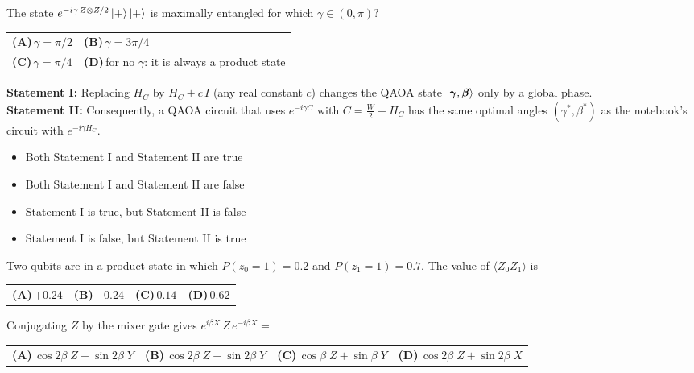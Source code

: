 \documentclass[11pt,a4paper]{article}
\newcommand{\optlabel}[1]{\textbf{(#1)}}
\newenvironment{qitem}[1]{\begin{list}{}{\setlength{\leftmargin}{3.3em}\setlength{\labelwidth}{3.1em}%
  \setlength{\labelsep}{0.2em}\setlength{\topsep}{3pt}\setlength{\parsep}{3pt}}\item[\textbf{Q.#1}\hfill]}{\end{list}}
\newcommand{\qsep}{\par\vspace{2pt}{\color{black!15}\hrule}\vspace{4pt}}
\begin{document}
\begin{qitem}{28}
The state $e^{-i\gamma\, Z\otimes Z/2}\ket{+}\ket{+}$ is maximally entangled for which $\gamma \in (0, \pi)$?
\par\smallskip\noindent\begin{tabularx}{\linewidth}{@{}*{2}{L}@{}}
\optlabel{A}\,$\gamma = \pi/2$ & \optlabel{B}\,$\gamma = 3\pi/4$ \\[3pt]
\optlabel{C}\,$\gamma = \pi/4$ & \optlabel{D}\,for no $\gamma$: it is always a product state
\end{tabularx}
\end{qitem}
\qsep

\begin{qitem}{29}
\textbf{Statement I:} Replacing $H_C$ by $H_C + c\,I$ (any real constant $c$) changes the QAOA state
$\ket{\boldsymbol\gamma, \boldsymbol\beta}$ only by a global phase.\\[1mm]
\textbf{Statement II:} Consequently, a QAOA circuit that uses $e^{-i\gamma C}$ with $C = \tfrac W2 - H_C$ has the same optimal
angles $(\gamma^*, \beta^*)$ as the notebook's circuit with $e^{-i\gamma H_C}$.
\begin{itemize}[leftmargin=2.6em, labelsep=0.4em, itemsep=2pt, topsep=3pt]
\item[\optlabel{A}] Both Statement I and Statement II are true
\item[\optlabel{B}] Both Statement I and Statement II are false
\item[\optlabel{C}] Statement I is true, but Statement II is false
\item[\optlabel{D}] Statement I is false, but Statement II is true
\end{itemize}
\end{qitem}
\qsep

\begin{qitem}{30}
Two qubits are in a product state in which $P(z_0 = 1) = 0.2$ and $P(z_1 = 1) = 0.7$. The value of $\langle Z_0Z_1\rangle$ is
\par\smallskip\noindent\begin{tabularx}{\linewidth}{@{}*{4}{L}@{}}
\optlabel{A}\,$+0.24$ & \optlabel{B}\,$-0.24$ & \optlabel{C}\,$0.14$ & \optlabel{D}\,$0.62$
\end{tabularx}
\end{qitem}
\qsep

\begin{qitem}{31}
Conjugating $Z$ by the mixer gate gives $e^{i\beta X}\,Z\,e^{-i\beta X} =$
\par\smallskip\noindent\begin{tabularx}{\linewidth}{@{}*{4}{L}@{}}
\optlabel{A}\,$\cos 2\beta\; Z - \sin 2\beta\; Y$ & \optlabel{B}\,$\cos 2\beta\; Z + \sin 2\beta\; Y$ & \optlabel{C}\,$\cos\beta\; Z + \sin\beta\; Y$ & \optlabel{D}\,$\cos 2\beta\; Z + \sin 2\beta\; X$
\end{tabularx}
\end{qitem}
\qsep
\end{document}
